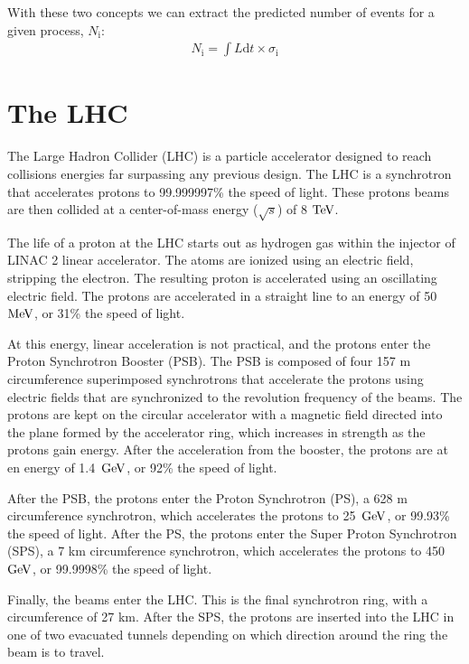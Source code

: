 With these two concepts we can extract the predicted number of events for a given process, $N_{\mathrm{i}}$: 
\begin{eqnarray}
N_{\mathrm{i}} = \int L \mathrm{d}t \times \sigma_{\mathrm{i}} 
\label{eqn:Nevents}
\end{eqnarray}  

\section{The LHC}
The Large Hadron Collider (LHC) is a particle accelerator designed to reach collisions energies far surpassing any previous design.  
The LHC is a synchrotron that accelerates protons to 99.999997\% the speed of light.  
These protons beams are then collided at a center-of-mass energy ($\sqrt{s}$) of 8 $\mathrm{TeV}$.  


The life of a proton at the LHC starts out as hydrogen gas within the injector of LINAC 2 linear accelerator.  
The atoms are ionized using an electric field, stripping the electron.  
The resulting proton is accelerated using an oscillating electric field.  
The protons are accelerated in a straight line to an energy of 50~$\mathrm{MeV}$, or 31\% the speed of light.  

At this energy, linear acceleration is not practical, and the protons enter the Proton Synchrotron Booster (PSB).  The PSB is composed of four 157 m 
circumference superimposed synchrotrons that accelerate the protons using electric fields that are synchronized to the revolution frequency of the beams.  
The protons are kept on the circular accelerator with a magnetic field directed into the plane formed by the accelerator ring, which increases in strength as the protons gain energy.  
After the acceleration from the booster, the protons are at en energy of 1.4~$\mathrm{GeV}$, or 92\% the speed of light.

After the PSB, the protons enter the Proton Synchrotron (PS), a 628 m circumference synchrotron, which accelerates the protons to 25~$\mathrm{GeV}$, or 99.93\% the speed of light.  
After the PS, the protons enter the Super Proton Synchrotron (SPS), a 7 km circumference synchrotron, which accelerates the protons to 450~$\mathrm{GeV}$, or 99.9998\% the speed of light.

Finally, the beams enter the LHC.  This is the final synchrotron ring, with a circumference of 27 km.  
After the SPS, the protons are inserted into the LHC in one of two evacuated tunnels depending on which direction around the ring the beam is to travel.  

